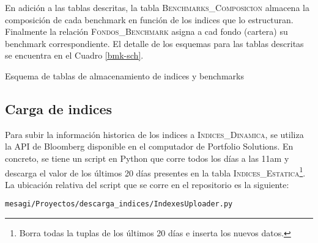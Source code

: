 \documentclass{article}
\begin{document}
 En adición a las tablas descritas, la tabla \textsc{Benchmarks\_Composicion} almacena la composición de cada benchmark en función de los indices que lo estructuran. Finalmente la relación \textsc{Fondos\_Benchmark} asigna a cad fondo (cartera) su benchmark correspondiente. El detalle de los esquemas para las tablas descritas se encuentra en el Cuadro \ref{bmk-sch}.

\begin{table}[h]
{\small
{}}
\caption{Esquema de tablas de almacenamiento de indices y benchmarks}
\label{bmk-sch}
\end{table}



\subsection{Carga de indices}
Para subir la información historica de los indices a \textsc{Indices\_Dinamica}, se utiliza la API de Bloomberg disponible en el computador de Portfolio Solutions. En concreto, se tiene un script en Python que corre todos los días a las 11am y descarga el valor de los últimos 20 días presentes en la tabla \textsc{Indices\_Estatica}\footnote{Borra todas la tuplas de los últimos 20 días e inserta los nuevos datos.}. La ubicación relativa del script que se corre en el repositorio es la siguiente:
\begin{center}
\texttt{mesagi/Proyectos/descarga\_indices/IndexesUploader.py}
\end{center}
\end{document}
